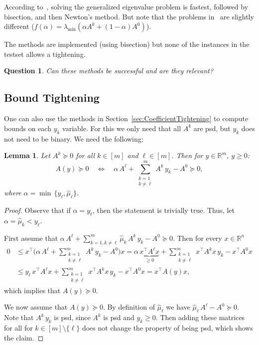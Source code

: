 \documentclass[10pt, a4paper]{article}
\newcommand{\T}{^{\top}}
\newcommand{\R}{\mathds{R}}
\newtheorem{lemma}[theorem]{Lemma}
\newtheorem{question}[theorem]{Question}
\begin{document}
According to~\cite{Str16,HigSS16}, solving the generalized eigenvalue
problem is fastest, followed by bisection, and then Newton's method. But
note that the problems in~\cite{Str16,HigSS16} are slightly different
($f(\alpha) = \lambda_{\min}(\alpha A^k + (1 - \alpha) A^0)$).

The methods are implemented (using bisection) but none of the instances in
the testset allows a tightening.

\begin{question}
  Can these methods be successful and are they relevant?
\end{question}



\subsection{Bound Tightening}

One can also use the methods in Section~\ref{sec:CoefficientTightening} to
compute bounds on each $y_k$ variable. For this we only need that all $A^k$
are psd, but $y_k$ does not need to be binary. We need the following:

\begin{lemma}
  Let $A^k \succeq 0$ for all $k \in [m]$ and $\ell \in [m]$. Then for
  $y \in \R^m$, $y \geq 0$:
  \[
    A(y) \succeq 0 \quad\Leftrightarrow\quad
    \alpha\, A^{\ell} + \sum_{\substack{k=1\\k \neq \ell}}^m A^k\, y_k - A^0 \succeq 0,
  \]
  where $\alpha = \min\,\{y_{\ell},\hat{\mu}_{\ell}\}$.
\end{lemma}

\begin{proof}
  Observe that if $\alpha = y_{\ell}$, then the statement is trivially
  true. Thus, let $\alpha = \hat{\mu}_k < y_{\ell}$.

  First assume that
  $\alpha\, A^{\ell} + \sum_{k=1,k \neq \ell}^m \hat{\mu}_k\, A^k\, y_k - A^0
  \succeq 0$.  Then for every $x \in \R^n$
  \begin{align*}
    0 & \leq x\T \bigg(\alpha\, A^{\ell} + \sum_{\substack{k=1\\k \neq \ell}}^m A^k\, y_k - A^0\bigg) x =
        \alpha\, \underbrace{x\T A^{\ell} x}_{\geq 0} + \sum_{\substack{k=1\\k \neq \ell}}^m x\T A^k
        x\, y_k - x\T A^0 x\\
      & \leq y_{\ell}\, x\T A^{\ell} x + \sum_{\substack{k=1\\k \neq \ell}}^m x\T A^k x\, y_k - x\T A^0 x
        = x\T A(y)x,
  \end{align*}
  which implies that $A(y) \succeq 0$.

  We now assume that $A(y) \succeq 0$. By definition of $\hat{\mu}_{\ell}$
  we have $\hat{\mu}_{\ell}\, A^{\ell} - A^0 \succeq 0$. Note that
  $A^k \, y_k$ is psd, since $A^k$ is psd and $y_k \geq 0$. Then adding
  these matrices for all for $k \in [m] \setminus \{\ell\}$ does not change
  the property of being psd, which shows the claim.
\end{proof}
\end{document}
